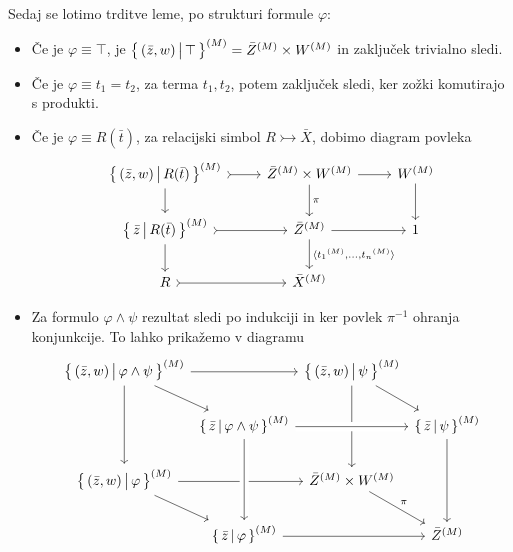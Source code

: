 \documentclass[../kategoricna_logika.tex]{subfiles}
\begin{document}
\begin{dokaz}
\begin{itemize}
    \end{itemize}
    Sedaj se lotimo trditve leme, po strukturi formule $\varphi$:
    \begin{itemize}
    \item Če je $\varphi \equiv \top$, je
      $\left\lbrace\,(\bar{z}, w) \,\middle|\, \top\,\right\rbrace^{(M)} = {\bar{Z}}^{(M)}
      \times {W}^{(M)}$ in zaključek trivialno sledi.
      
    \item Če je $\varphi \equiv t_1 = t_2$, za terma $t_1, t_2$, potem
      zaključek sledi, ker zožki komutirajo s produkti.
      
    \item Če je $\varphi \equiv R(\bar{t})$, za relacijski simbol
      $R \rightarrowtail \bar{X}$, dobimo diagram povleka
      \begin{equation*}
        \begin{tikzcd}[column sep=normal]
          \set{(\bar{z},w) \,\middle|\, R(\bar{t})}^{(M)} \ar[d] \ar[r, tail] &
          \interp{\bar{Z}} \times \interp{W} \ar[d, "\pi"] \ar[r] & \interp{W} \ar[d] \\
          \set{\bar{z} \,\middle|\, R(\bar{t})}^{(M)} \ar[d] \ar[r, tail] &
          \interp{\bar{Z}} \ar[d, "\fprod{\interp{t_1}, \ldots, \interp{t_n}}"] \ar[r] & 1 \\
          R \ar[r, tail] & \interp{\bar{X}}
        \end{tikzcd}
      \end{equation*}
      
    \item Za formulo $\varphi \land \psi$ rezultat sledi po indukciji
      in ker povlek $\pi^{-1}$ ohranja konjunkcije.  To lahko
      prikažemo v diagramu
      \begin{equation*}
        \begin{tikzcd}[row sep=normal, column sep=0.2em]
          \setb{(\bar{z}, w)}{\varphi \land \psi}^{(M)} \ar[dd] \ar[dr] \ar[rr] & &
          \setb{(\bar{z}, w)}{\psi}^{(M)} \ar[dd] \ar[dr] \\
          & \setb{\bar{z}}{\varphi \land \psi}^{(M)}   \ar[rr, crossing over] & &
          \setb{\bar{z}}{\psi}^{(M)} \ar[dd] \\
          \setb{(\bar{z}, w)}{\varphi}^{(M)} \ar[dr] \ar[rr]  & &
          \bar{Z}^{(M)} \times \interp{W} \ar[dr, "\pi"] \\
          & \setb{\bar{z}}{\varphi}^{(M)} \ar[rr] \ar[from=uu,
          crossing over] && \interp{\bar{Z}}
        \end{tikzcd}
      \end{equation*}


\end{itemize}
\end{dokaz}
\end{document}
